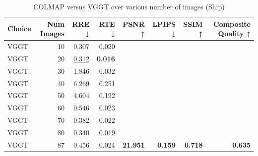 \begin{table}[H]
\caption{COLMAP versus VGGT over various number of images (Ship)}
\label{tab:01_num_images_ship}
\begin{tabular}{lrrrrrrr}
\toprule
Choice & Num Images & RRE ↓ & RTE ↓ & PSNR ↑ & LPIPS ↓ & SSIM ↑ & Composite Quality ↑ \\
\midrule
VGGT & 10 & 0.307 & 0.020 &  &  &  &  \\
VGGT & 20 & \underline{0.312} & \textbf{0.016} &  &  &  &  \\
VGGT & 30 & 1.846 & 0.032 &  &  &  &  \\
VGGT & 40 & 6.269 & 0.251 &  &  &  &  \\
VGGT & 50 & 4.604 & 0.192 &  &  &  &  \\
VGGT & 60 & 0.546 & 0.023 &  &  &  &  \\
VGGT & 70 & 0.382 & 0.022 &  &  &  &  \\
VGGT & 80 & 0.340 & \underline{0.019} &  &  &  &  \\
VGGT & 87 & 0.456 & 0.024 & \textbf{21.951} & \textbf{0.159} & \textbf{0.718} & \textbf{0.635} \\
\bottomrule
\end{tabular}
\end{table}
